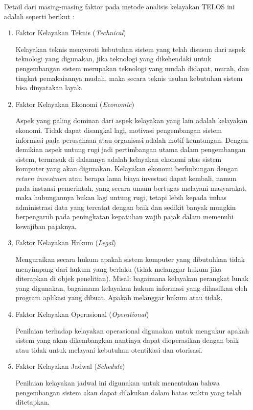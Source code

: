 \documentclass[pdftex,12pt, oneside]{article}
\begin{document}
Detail dari masing-masing faktor pada metode analisis kelayakan TELOS ini adalah seperti berikut :

\begin{enumerate}
	\item Faktor Kelayakan Teknis (\textit{Technical})
	
Kelayakan teknis menyoroti kebutuhan sistem yang telah disusun dari aspek teknologi yang digunakan, jika teknologi yang dikehendaki untuk pengembangan sistem merupakan teknologi yang mudah didapat, murah, dan tingkat pemakaiannya mudah, maka secara teknis usulan kebutuhan sistem bisa dinyatakan layak.

	\item Faktor Kelayakan Ekonomi (\textit{Economic})
	
Aspek yang paling dominan dari aspek kelayakan yang lain adalah kelayakan ekonomi. Tidak dapat disangkal lagi, motivasi pengembangan sistem informasi pada perusahaan atau organisasi adalah motif keuntungan. Dengan demikian aspek untung rugi jadi pertimbangan utama dalam pengembangan sistem, termasuk di dalamnya adalah kelayakan ekonomi atas sistem komputer yang akan digunakan. Kelayakan ekonomi berhubungan dengan \textit{return investmen} atau berapa lama biaya investasi dapat kembali, namun pada instansi pemerintah, yang secara umum bertugas melayani masyarakat, maka hubungannya bukan lagi untung rugi, tetapi lebih kepada imbas administrasi data yang tercatat dengan baik dan sedikit banyak mungkin berpengaruh pada peningkatan kepatuhan wajib pajak dalam memenuhi kewajiban pajaknya.	

	\item Faktor Kelayakan Hukum (\textit{Legal})
	
Menguraikan secara hukum apakah sistem komputer yang dibutuhkan tidak menyimpang dari hukum yang berlaku (tidak melanggar hukum jika diterapkan di objek penelitian). Misal: bagaimana kelayakan perangkat lunak yang digunakan, bagaimana kelayakan hukum informasi yang dihasilkan oleh program aplikasi yang dibuat. Apakah melanggar hukum atau tidak.	

	\item Faktor Kelayakan Operasional (\textit{Operational})

Penilaian terhadap kelayakan operasional digunakan untuk mengukur apakah sistem yang akan dikembangkan nantinya dapat dioperasikan dengan baik atau tidak untuk melayani kebutuhan otentikasi dan otorisasi.	

	\item Faktor Kelayakan Jadwal (\textit{Schedule})
	
Penilaian kelayakan jadwal ini digunakan untuk menentukan bahwa pengembangan sistem akan dapat dilakukan dalam batas waktu yang telah ditetapkan.	

\end{enumerate}
\end{document}
